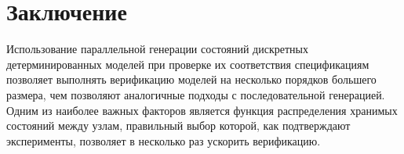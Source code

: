 \documentclass[12pt,a4paper,fleqn]{article}
\begin{document}
\section{Заключение}
\label{sec:conclusion}

Использование параллельной генерации состояний дискретных детерминированных моделей при проверке их соответствия
спецификациям позволяет выполнять верификацию моделей на несколько порядков большего размера, чем позволяют аналогичные
подходы с последовательной генерацией. Одним из наиболее важных факторов является функция распределения хранимых
состояний между узлам, правильный выбор которой, как подтверждают эксперименты, позволяет в несколько раз ускорить
верификацию.



\end{document}
